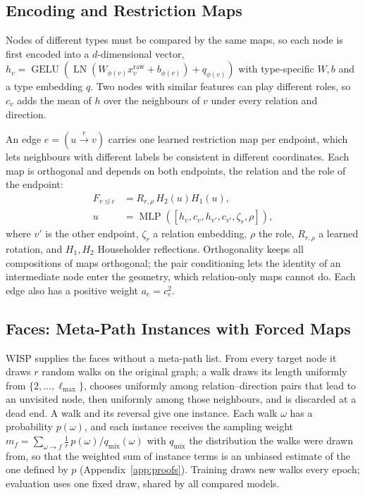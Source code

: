\documentclass{article}
\newcommand{\wisp}{\textsc{WISP}}
\newcommand{\inc}{\trianglelefteq}
\begin{document}
\subsection{Encoding and Restriction Maps}
Nodes of different types must be compared by the same maps, so each node is first encoded into a $d$-dimensional vector, $h_v=\operatorname{GELU}(\operatorname{LN}(W_{\phi(v)}x^{\mathrm{raw}}_v+b_{\phi(v)})+q_{\phi(v)})$ with type-specific $W,b$ and a type embedding $q$. Two nodes with similar features can play different roles, so $c_v$ adds the mean of $h$ over the neighbours of $v$ under every relation and direction.

An edge $e=(u\xrightarrow{r}v)$ carries one learned restriction map per endpoint, which lets neighbours with different labels be consistent in different coordinates. Each map is orthogonal and depends on both endpoints, the relation and the role of the endpoint:
\begin{equation}
\begin{aligned}
  F_{v\inc e}&=R_{r,\rho}\,H_2(u)H_1(u),\\
  u&=\operatorname{MLP}([h_v,c_v,h_{v'},c_{v'},\zeta_r,\rho]),
\end{aligned}
  \label{eq:maps}
\end{equation}
where $v'$ is the other endpoint, $\zeta_r$ a relation embedding, $\rho$ the role, $R_{r,\rho}$ a learned rotation, and $H_1,H_2$ Householder reflections. Orthogonality keeps all compositions of maps orthogonal; the pair conditioning lets the identity of an intermediate node enter the geometry, which relation-only maps cannot do. Each edge also has a positive weight $a_e=c_e^2$.

\subsection{Faces: Meta-Path Instances with Forced Maps}
\label{sec:wisp}
\wisp{} supplies the faces without a meta-path list. From every target node it draws $r$ random walks on the original graph; a walk draws its length uniformly from $\{2,\ldots,\ell_{\max}\}$, chooses uniformly among relation--direction pairs that lead to an unvisited node, then uniformly among those neighbours, and is discarded at a dead end. A walk and its reversal give one instance. Each walk $\omega$ has a probability $p(\omega)$, and each instance receives the sampling weight $m_f=\sum_{\omega\to f}\frac1r\,p(\omega)/q_{\mathrm{mix}}(\omega)$ with $q_{\mathrm{mix}}$ the distribution the walks were drawn from, so that the weighted sum of instance terms is an unbiased estimate of the one defined by $p$ (Appendix~\ref{app:proofs}). Training draws new walks every epoch; evaluation uses one fixed draw, shared by all compared models.
\end{document}
